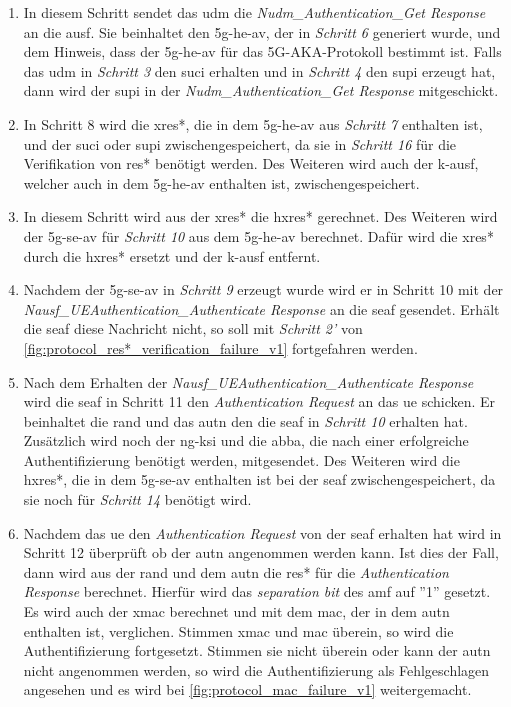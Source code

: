\begin{enumerate}
\item In diesem Schritt sendet das \gls{udm} die \textit{Nudm\_Authentication\_Get Response} an die \gls{ausf}.
Sie beinhaltet den \gls{5g-he-av}, der in \textit{Schritt 6} generiert wurde, und dem Hinweis, dass der \gls{5g-he-av} für das 5G-AKA-Protokoll bestimmt ist.
Falls das \gls{udm} in \textit{Schritt 3} den \gls{suci} erhalten und in \textit{Schritt 4} den \gls{supi} erzeugt hat, dann wird der \gls{supi} in der \textit{Nudm\_Authentication\_Get Response} mitgeschickt.

\item In Schritt 8 wird die \gls{xres*}, die in dem \gls{5g-he-av} aus \textit{Schritt 7} enthalten ist, und der \gls{suci} oder \gls{supi} zwischengespeichert, da sie in \textit{Schritt 16} für die Verifikation von \gls{res*} benötigt werden.
Des Weiteren wird auch der \gls{k-ausf}, welcher auch in dem \gls{5g-he-av} enthalten ist, zwischengespeichert.

\item In diesem Schritt wird aus der \gls{xres*} die \gls{hxres*} gerechnet.
Des Weiteren wird der \gls{5g-se-av} für \textit{Schritt 10} aus dem \gls{5g-he-av} berechnet.
Dafür wird die \gls{xres*} durch die \gls{hxres*} ersetzt und der \gls{k-ausf} entfernt.

\item Nachdem der \gls{5g-se-av} in \textit{Schritt 9} erzeugt wurde wird er in Schritt 10 mit der \textit{Nausf\_UEAuthentication\_Authenticate Response} an die \gls{seaf} gesendet.
Erhält die \gls{seaf} diese Nachricht nicht, so soll mit \textit{Schritt 2'} von \cref{fig:protocol_res*_verification_failure_v1} fortgefahren werden.

\item Nach dem Erhalten der \textit{Nausf\_UEAuthentication\_Authenticate Response} wird die \gls{seaf} in Schritt 11 den \textit{Authentication Request}  an das \gls{ue} schicken.
Er beinhaltet die \gls{rand} und das \gls{autn} den die \gls{seaf} in \textit{Schritt 10} erhalten hat.
Zusätzlich wird noch der \gls{ng-ksi} und die \gls{abba}, die nach einer erfolgreiche Authentifizierung benötigt werden, mitgesendet.
Des Weiteren wird die \gls{hxres*}, die in dem \gls{5g-se-av} enthalten ist bei der \gls{seaf} zwischengespeichert, da sie noch für \textit{Schritt 14} benötigt wird.

\item Nachdem das \gls{ue} den \textit{Authentication Request} von der \gls{seaf} erhalten hat wird in Schritt 12 überprüft ob der \gls{autn} angenommen werden kann.
Ist dies der Fall, dann wird aus der \gls{rand} und dem \gls{autn} die \gls{res*} für die \textit{Authentication Response} berechnet.
Hierfür wird das \textit{separation bit} des \gls{amf} auf ''1'' gesetzt.
Es wird auch der \gls{xmac} berechnet und mit dem \gls{mac}, der in dem \gls{autn} enthalten ist, verglichen.
Stimmen \gls{xmac} und \gls{mac} überein, so wird die Authentifizierung fortgesetzt.
Stimmen sie nicht überein oder kann der \gls{autn} nicht angenommen werden, so wird die Authentifizierung als Fehlgeschlagen angesehen und es wird bei \cref{fig:protocol_mac_failure_v1} weitergemacht.


\end{enumerate}
